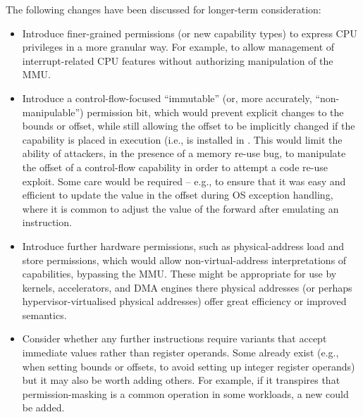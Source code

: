 The following changes have been discussed for longer-term consideration:

\begin{itemize}

\item Introduce finer-grained permissions (or new capability types) to express
  CPU privileges in a more granular way.
  For example, to allow management of interrupt-related CPU features without
  authorizing manipulation of the MMU.

\item Introduce a control-flow-focused ``immutable'' (or, more accurately,
  ``non-manipulable'') permission bit, which would prevent explicit changes to
  the bounds or offset, while still allowing the offset to be implicitly
  changed if the capability is placed in execution (i.e., is installed in
  \PCC{}.
  This would limit the ability of attackers, in the presence of a memory
  re-use bug, to manipulate the offset of a control-flow capability in order
  to attempt a code re-use exploit.
  Some care would be required -- e.g., to ensure that it was easy and
  efficient to update the value in the offset during OS exception handling,
  where it is common to adjust the value of the \PC{} forward after emulating
  an instruction.

\item Introduce further hardware permissions, such as physical-address load
  and store permissions, which would allow non-virtual-address interpretations
  of capabilities, bypassing the MMU.
  These might be appropriate for use by kernels, accelerators, and DMA engines
  there physical addresses (or perhaps hypervisor-virtualised physical
  addresses) offer great efficiency or improved semantics.

\item Consider whether any further instructions require variants that accept
  immediate values rather than register operands.
  Some already exist (e.g., when setting bounds or offsets, to avoid setting
  up integer register operands) but it may also be worth adding others.
  For example, if it transpires that permission-masking is a common operation
  in some workloads, a new  could be added.


\end{itemize}
